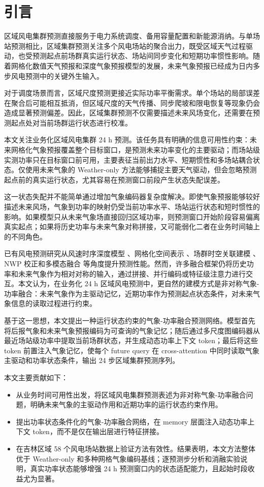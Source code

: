 \section{引言}

区域风电集群预测直接服务于电力系统调度、备用容量配置和新能源消纳。与单场站预测相比，区域集群预测关注多个风电场站的聚合出力，既受区域天气过程驱动，也受预测起点前场群真实运行状态、场站间同步变化和短期功率惯性影响。随着网格化数值天气预报和深度气象预报模型的发展，未来气象预报已经成为日内多步风电预测中的关键外生输入。

对于调度场景而言，区域尺度预测更接近实际功率平衡需求。单个场站的局部误差在聚合后可能相互抵消，但区域尺度的天气传播、同步爬坡和限电恢复等现象仍会造成显著预测偏差。因此，区域集群预测不仅需要描述未来风场变化，还需要在预测起点处对当前场群运行状态进行校准。

本文关注业务化区域风电集群 24 h 预测。该任务具有明确的信息可用性约束：未来网格化气象预报覆盖整个目标窗口，是预测未来功率变化的主要驱动；而场站级实测功率只在目标窗口前可用，主要表征当前出力水平、短期惯性和多场站耦合状态。仅使用未来气象的 Weather-only 方法能够捕捉主要天气驱动，但会忽略预测起点前的真实运行状态，尤其容易在预测窗口前段产生状态失配误差。

这一状态失配并不能简单通过增加气象编码器复杂度解决。即使气象预报能够较好描述未来风场，气象到功率的映射仍受当前功率水平、场站运行状态和短时惯性的影响。如果模型只从未来气象场直接回归区域功率，则预测窗口开始阶段容易偏离真实起点；如果将历史功率与未来气象对称拼接，又可能弱化二者在业务时间轴上的不同角色。

已有风电预测研究从风速时序深度模型 \cite{ref1}、网格化空间表示 \cite{ref2}、场群时空关联建模 \cite{ref3,ref4,ref5,ref6,ref7,ref8,ref9,ref10,ref11,ref12}、NWP 校正和多模态融合 \cite{ref13,ref14,ref15,ref16,ref17,ref18} 等角度提升预测性能。然而，许多融合框架仍将历史功率和未来气象作为相对对称的输入，通过拼接、并行编码或特征级注意力进行交互。本文认为，在业务化 24 h 区域风电预测中，更自然的建模方式是非对称气象-功率融合：未来气象作为主驱动记忆，近期功率作为预测起点状态条件，对未来气象信息的读取过程进行约束。

基于这一思想，本文提出一种运行状态约束的气象-功率融合预测网络。模型首先将后报气象和未来气象预报编码为可查询的气象记忆；随后通过多尺度图编码器从最近场站级功率中提取当前场群状态，并生成动态功率上下文 token；最后将这些 token 前置注入气象记忆，使每个 future query 在 cross-attention 中同时读取气象主驱动和功率状态条件，输出 24 步区域集群预测序列。

本文主要贡献如下：
\begin{itemize}
\item 从业务时间可用性出发，将区域风电集群预测表述为非对称气象-功率融合问题，明确未来气象的主驱动作用和近期功率的运行状态约束作用。
\item 提出功率状态条件化的气象-功率融合网络，在 memory 层面注入动态功率上下文 token，而不是仅在输出层进行特征拼接。
\item 在吉林区域 58 个风电场站数据上验证方法有效性。结果表明，本文方法整体优于 Weather-only 和多种网格气象编码基线；逐预测步分析和消融实验说明，真实功率状态能够增强 24 h 预测窗口内的状态适配能力，且起始时段收益尤为显著。
\end{itemize}

